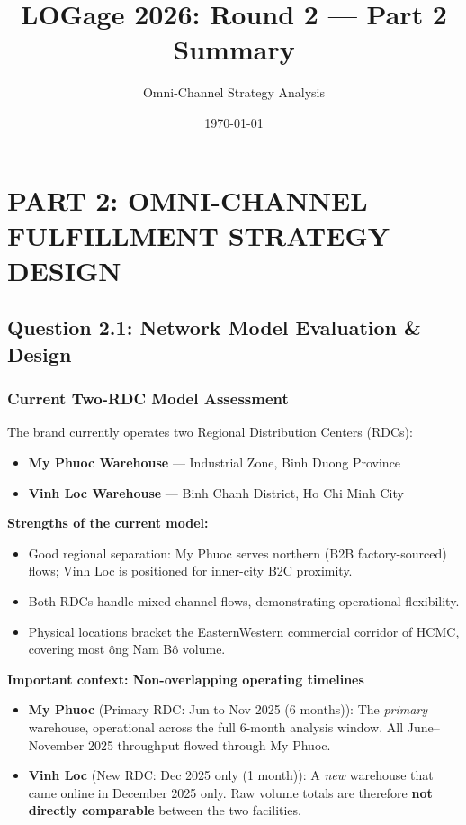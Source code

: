 \documentclass[11pt]{article}
\title{\textbf{LOGage 2026: Round 2 — Part 2 Summary}}
\author{Omni-Channel Strategy Analysis}
\date{\today}
\begin{document}
\maketitle
\tableofcontents
\newpage

\section{PART 2: OMNI-CHANNEL FULFILLMENT STRATEGY DESIGN}

\subsection{Question 2.1: Network Model Evaluation \& Design}

\subsubsection{Current Two-RDC Model Assessment}

The brand currently operates two Regional Distribution Centers (RDCs):
\begin{itemize}
  \item \textbf{My Phuoc Warehouse} — Industrial Zone, Binh Duong Province
  \item \textbf{Vinh Loc Warehouse} — Binh Chanh District, Ho Chi Minh City
\end{itemize}

\textbf{Strengths of the current model:}
\begin{itemize}
  \item Good regional separation: My Phuoc serves northern (B2B factory-sourced) flows; Vinh Loc is positioned for inner-city B2C proximity.
  \item Both RDCs handle mixed-channel flows, demonstrating operational flexibility.
  \item Physical locations bracket the Eastern\textendash{}Western commercial corridor of HCMC, covering most \DJ{}\^ong Nam B\^o volume.
\end{itemize}

\textbf{Important context: Non-overlapping operating timelines}
\begin{itemize}
  \item \textbf{My Phuoc} (Primary RDC: Jun to Nov 2025 (6 months)): The \textit{primary} warehouse, operational across the full 6-month analysis window. All June--November 2025 throughput flowed through My Phuoc.
  \item \textbf{Vinh Loc} (New RDC: Dec 2025 only (1 month)): A \textit{new} warehouse that came online in December 2025 only. Raw volume totals are therefore \textbf{not directly comparable} between the two facilities.
\end{itemize}
\end{document}
